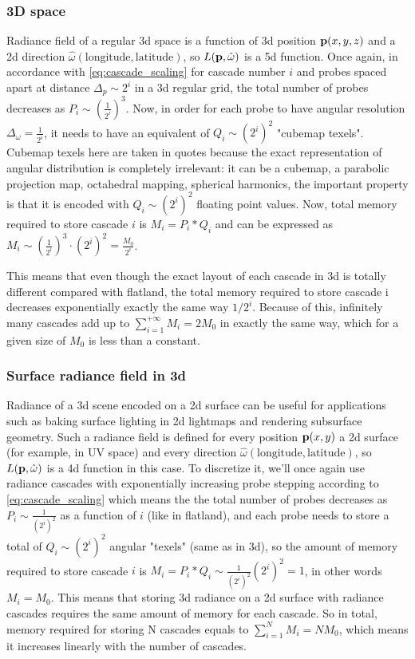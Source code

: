 \documentclass{jcgt}
\begin{document}
\subsubsection{3D space}
Radiance field of a regular 3d space is a function of 3d position $\textbf p(x, y, z)$ and a 2d direction $\hat \omega(\text{longitude}, \text{latitude})$, so $L(\textbf p, \hat \omega)$ is a 5d function. Once again, in accordance with \ref{eq:cascade_scaling} for cascade number $i$ and probes spaced apart at distance $\Delta_p\sim 2^i$ in a 3d regular grid, the total number of probes decreases as $P_i\sim(\frac{1}{2^i})^3$. Now, in order for each probe to have angular resolution 
$\Delta_\omega=\frac{1}{2^i}$, it needs to have an equivalent of $Q_i\sim(2^i)^2$ "cubemap texels". Cubemap texels here are taken in quotes because the exact representation of angular distribution is completely
irrelevant: it can be a cubemap, a parabolic projection map, octahedral mapping, spherical harmonics, the important property is that it is encoded with $Q_i\sim(2^i)^2$ floating point values. Now, total memory required to store cascade $i$ is $M_i=P_i*Q_i$ and can be expressed as $M_i\sim (\frac{1}{2^i})^3\cdot(2^i)^2=\frac{M_0}{2^i}$.

This means that even though the exact layout of each cascade in 3d is totally different compared with flatland, the total memory required to store cascade i decreases exponentially exactly the same way $1/2^i$. Because of this, infinitely many cascades add up to $\sum_{i=1}^{+\infty} M_i=2M_0$ in exactly the same way, which for a given size of $M_0$ is less than a constant.

\subsubsection{Surface radiance field in 3d}
\label{sub:surface_scaling}
Radiance of a 3d scene encoded on a 2d surface can be useful for applications such as baking surface lighting in 2d lightmaps and rendering subsurface geometry. Such a radiance field is defined
for every position $\textbf p(x, y)$ a 2d surface (for example, in UV space) and every direction $\hat \omega(\text{longitude}, \text{latitude})$, so $L(\textbf p, \hat \omega)$ is a 4d function in this case. To discretize it, we'll once again use radiance cascades with exponentially increasing probe stepping according to \ref{eq:cascade_scaling} which means the the total number of probes decreases as $P_i\sim \frac{1}{(2^i)^2}$ as a function of $i$ (like in flatland), and each probe needs to store a total of $Q_i\sim(2^i)^2$ angular "texels" (same as in 3d), so the amount of memory required to store cascade $i$ is $M_i=P_i*Q_i \sim \frac{1}{(2^i)^2}(2^i)^2 = 1$, in other words $M_i=M_0$. This means that storing 3d radiance on a 2d surface with radiance cascades requires the same amount of memory for each cascade. So in total, memory required for storing N cascades equals to $\sum_{i=1}^{N}M_i=NM_0$, which means it increases linearly with the number of cascades.
\end{document}
